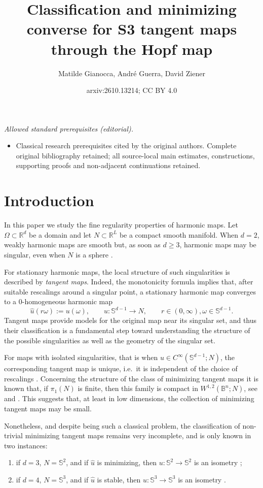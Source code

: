 \documentclass[11pt]{article}
\title{Classification and minimizing converse for S3 tangent maps through the Hopf map}
\author{Matilde Gianocca, André Guerra, David Ziener}
\date{arxiv:2610.13214; CC BY 4.0}
\theoremstyle{plain}
\numberwithin{equation}{section}
\theoremstyle{definition}
\def \mb{\mathbb}
\begin{document}
\maketitle
\noindent\textit{Allowed standard prerequisites (editorial).}\begin{itemize}
\item Classical research prerequisites cited by the original authors. Complete original bibliography retained; all source-local main estimates, constructions, supporting proofs and non-adjacent continuations retained.
\end{itemize}\medskip
\section{Introduction}
In this paper we study the fine regularity properties of harmonic maps. Let $\Omega\subset \mathbb{R}^d$ be a domain and let $N\subset \mathbb{R}^L$ be a compact smooth manifold. When $d=2$, weakly harmonic maps are smooth \cite{Helein2002} but, as soon as $d\geq 3$, harmonic maps may be singular, even when $N$ is a sphere \cite{Lin2008}. 

For  stationary harmonic maps, the local structure of such singularities is described by \textit{tangent maps}. Indeed, the monotonicity formula implies that, after suitable rescalings around a singular point, a stationary harmonic map converges to a 0-homogeneous harmonic map
$$\hat u(r \omega):= u(\omega), \qquad   u\colon \mb S^{d-1}\to N, \qquad r\in (0,\infty), \omega\in \mb S^{d-1}.$$
Tangent maps provide models for the original map near its singular set, and thus their classification is a fundamental step toward understanding the structure of the possible singularities as well as the geometry of the singular set.

For maps with isolated singularities, that is when $u\in C^\infty(\mb S^{d-1};N)$, the corresponding tangent map is unique, i.e.\ it is independent of the choice of rescalings \cite{Simon1983}. Concerning the structure of the class of minimizing tangent maps  it is known that, if $\pi_1(N)$ is finite, then this family is compact in $W^{1,2}(\mb B^n;N)$, see \cite[Theorem 5.7]{Mazowiecka2018} and \cite[Theorem 6.4]{Hardt1987a}. This suggests that, at least in low dimensions, the collection of minimizing tangent maps may be small.

Nonetheless,  and despite being such a classical problem, the classification of non-trivial minimizing tangent maps remains very incomplete, and is only known in two instances:
\begin{enumerate}
\item\label{it:BCL} if $d=3$, $N=\mb S^2$, and if $\hat u$ is minimizing,  then $u\colon \mb S^2\to \mb S^2$ is an isometry \cite{Brezis1986};
\item \label{it:Naka} if $d=4$, $N=\mb S^3$, and if $\hat u$ is stable, then $u\colon \mb S^3\to \mb S^3$ is an isometry \cite{Nakajima2006}. 
\end{enumerate}
\end{document}
